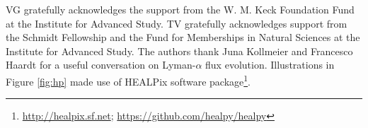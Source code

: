 \acknowledgements

VG gratefully acknowledges the support from the W. M. Keck Foundation Fund at the Institute for Advanced Study. TV gratefully acknowledges support from the Schmidt Fellowship and the Fund for Memberships in Natural Sciences at the Institute for Advanced Study. The authors thank Juna Kollmeier and Francesco Haardt for a useful conversation on Lyman-$\alpha$ flux evolution. Illustrations in Figure \ref{fig:hp} made use of HEALPix \cite{2005ApJ...622..759G} software package\footnote{\url{ http://healpix.sf.net}; \url{https://github.com/healpy/healpy}}.